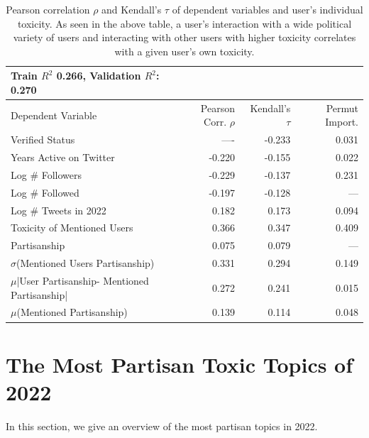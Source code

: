\begin{table}[!h]
    \small
    \centering
    \begin{tabularx}{0.9\columnwidth}{l|rrr}
    Train $R^2$ 0.266, Validation $R^2$:  0.270 \\
    \toprule
      Dependent Variable  & Pearson Corr. $\rho$ & Kendall's $\tau$ & Permut Import. \\    \midrule
  Verified Status & ---- &-0.233& 0.031  \\
  Years Active on Twitter & -0.220& -0.155 & 0.022 \\
  Log \# Followers & -0.229 &-0.137 & 0.231  \\
  Log \# Followed & -0.197 & -0.128 & --- \\
  Log \# Tweets in 2022 & 0.182 & 0.173  & 0.094\\
  Toxicity of Mentioned Users& 0.366& 0.347 & 0.409 \\
  Partisanship  &0.075& 0.079 & --- \\
  $\sigma$(Mentioned Users Partisanship)&0.331& 0.294	& 0.149\\
  $\mu$|User Partisanship- Mentioned Partisanship|&0.272& 0.241 & 0.015\\
  $\mu$(Mentioned Partisanship)& 0.139 &0.114 & 0.048  \\
    \bottomrule
    \end{tabularx}
  \caption{Pearson correlation $\rho$ and Kendall's $\tau$ of dependent variables and user's individual toxicity. As seen in the above table, a user's interaction with a wide political variety of users and interacting with other users with higher toxicity correlates with a given user's own toxicity. } 
   \vspace{-15pt}
   \label{table:regression-not-important}
\end{table}

\clearpage
\newpage

\section{The Most Partisan Toxic Topics of 2022\label{sec:partisan-toxic}}
In this section, we give an overview of the most partisan topics in 2022.





